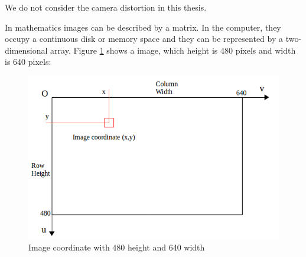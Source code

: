 We do not consider the camera distortion in this thesis.

In mathematics images can be described by a matrix. In the computer, they occupy a continuous disk or memory space and they can be represented by a two-dimensional array. Figure \ref{fig:image} shows a image, which height is 480 pixels and width is 640 pixels:
\begin{figure}[h]
\centering
\includegraphics[scale=0.5]{./fig/image.png}
\caption{Image coordinate with 480 height and 640 width}
\label{fig:image}
\end{figure}


